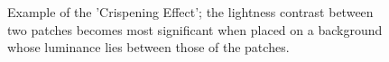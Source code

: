 \documentclass[journal,onecolumn]{IEEEtran}
\begin{document}
\begin{figure}[h]
\begin{subfigure}[b]{0.2\textwidth}
                \caption{}
                \label{fig:crispening-effect-c}
        \end{subfigure}
        \caption{Example of the 'Crispening Effect'; the lightness contrast between two patches becomes most significant when placed on a background whose luminance lies between those of the patches.}
\end{figure}
\end{document}
